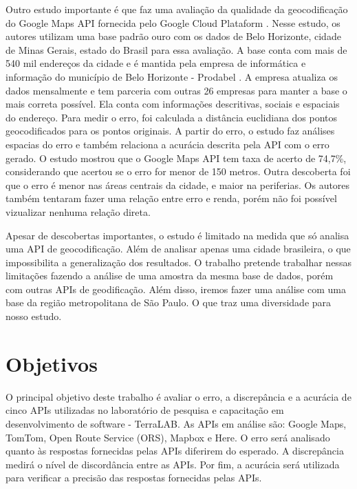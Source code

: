 Outro estudo importante é \cite{Clodoveu2011} que faz uma avaliação da qualidade da geocodificação do Google Maps API fornecida pelo Google Cloud Plataform \cite{GCP}. Nesse estudo, os autores utilizam uma base padrão ouro com os dados de Belo Horizonte, cidade de Minas Gerais, estado do Brasil para essa avaliação. A base conta com mais de 540 mil endereços da cidade e é mantida pela empresa de informática e informação do município de Belo Horizonte - Prodabel \cite{Prodabel}. A empresa atualiza os dados mensalmente
e tem parceria com outras 26 empresas para manter a base o mais correta possível. Ela conta com informações descritivas, sociais e espaciais do endereço. Para medir o erro, foi calculada a distância euclidiana dos pontos geocodificados para os pontos originais. A partir do erro, o estudo faz análises espacias do erro e também relaciona a acurácia descrita pela API com o erro gerado. O estudo mostrou que o Google Maps API tem taxa de acerto de 74,7\%, considerando que acertou se o erro for menor de 150 metros. Outra descoberta foi que o erro é menor nas áreas centrais da cidade, e maior na periferias. Os autores também tentaram fazer uma relação entre erro e renda, porém não foi possível vizualizar nenhuma relação direta. 

Apesar de descobertas importantes, o estudo é limitado na medida que só analisa uma API de geocodificação. Além de analisar apenas uma cidade brasileira, o que impossibilita a generalização dos resultados. O trabalho pretende trabalhar nessas limitações fazendo a análise de uma amostra da mesma base de dados, porém com outras APIs de geodificação. Além disso, iremos fazer uma análise com uma base da região metropolitana de São Paulo. O que traz uma diversidade para nosso estudo. 

\section{Objetivos}
O principal objetivo deste trabalho é avaliar o erro, a discrepância e a acurácia de cinco APIs utilizadas no laboratório de pesquisa e capacitação em desenvolvimento de software - TerraLAB. As APIs em análise são: Google Maps, TomTom, Open Route Service (ORS), Mapbox e Here. O erro será analisado quanto às respostas fornecidas pelas APIs diferirem do esperado. A discrepância medirá o nível de discordância entre as APIs. Por fim, a acurácia será utilizada para verificar a precisão das respostas fornecidas pelas APIs.


